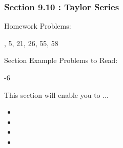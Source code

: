 %
%

\begin{frame}
\frametitle{\LARGE {\color[rgb]{0.02,0.20,1.0} Section 9.10 : Taylor Series}}
\vspace{0.8cm}
\begin{block}{Homework Problems:}

\vspace{0.2cm}
, 5, 21, 26, 55, 58
	
\end{block}
\vspace{0.5cm}

\begin{block}{Section Example Problems to Read:}

\vspace{0.2cm}
-6
	
\end{block}
\vspace{0.2cm}

\begin{block}{This section will enable you to ...}
\begin{itemize}
	\item[...] 
	\item[...] 
	\item[...] 
	\item[...] 
\end{itemize}
\end{block}
\vspace{3.0cm}
\end{frame}
